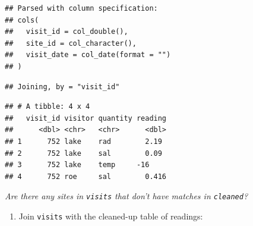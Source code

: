 \documentclass[]{Nemilov}
\newenvironment{Shaded}{\begin{snugshade}}{\end{snugshade}}
\newcommand{\DataTypeTok}[1]{\textcolor[rgb]{0.13,0.29,0.53}{#1}}
\newcommand{\KeywordTok}[1]{\textcolor[rgb]{0.13,0.29,0.53}{\textbf{#1}}}
\newcommand{\NormalTok}[1]{#1}
\newcommand{\OperatorTok}[1]{\textcolor[rgb]{0.81,0.36,0.00}{\textbf{#1}}}
\newcommand{\StringTok}[1]{\textcolor[rgb]{0.31,0.60,0.02}{#1}}
\providecommand{\tightlist}{%
  \setlength{\itemsep}{0pt}\setlength{\parskip}{0pt}}
\begin{document}
\begin{Shaded}
\end{Shaded}

\begin{verbatim}
## Parsed with column specification:
## cols(
##   visit_id = col_double(),
##   site_id = col_character(),
##   visit_date = col_date(format = "")
## )
\end{verbatim}

\begin{Shaded}
\end{Shaded}

\begin{verbatim}
## Joining, by = "visit_id"
\end{verbatim}

\begin{verbatim}
## # A tibble: 4 x 4
##   visit_id visitor quantity reading
##      <dbl> <chr>   <chr>      <dbl>
## 1      752 lake    rad        2.19 
## 2      752 lake    sal        0.09 
## 3      752 lake    temp     -16    
## 4      752 roe     sal        0.416
\end{verbatim}

\emph{Are there any sites in \texttt{visits} that don't have matches in \texttt{cleaned}?}

\begin{enumerate}
\def\labelenumi{\arabic{enumi}.}
\setcounter{enumi}{6}
\tightlist
\item
  Join \texttt{visits} with the cleaned-up table of readings:
\end{enumerate}

\begin{Shaded}
\end{Shaded}
\end{document}
